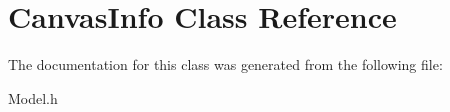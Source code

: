 \hypertarget{classCanvasInfo}{}\section{Canvas\+Info Class Reference}
\label{classCanvasInfo}


The documentation for this class was generated from the following file\+:\begin{DoxyCompactItemize}
\item 
Model.\+h\end{DoxyCompactItemize}
